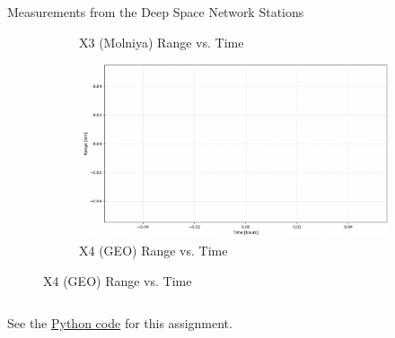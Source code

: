 \begin{hwkProblem}{4}{Measurements from the Deep Space Network Stations}
\begin{figure}[H]
\begin{center}
\begin{subfigure}{0.4\textwidth}
				\caption{X3 (Molniya) Range vs. Time}
			\end{subfigure}
			\begin{subfigure}{0.4\textwidth} \label{fig:s04b4}
				\includegraphics[width=\linewidth]{./images/s04b4.png}
				\caption{X4 (GEO) Range vs. Time}
			\end{subfigure}
		\end{center}
	\end{figure}

	\hwkPart{} \label{hwk:s04c}

	\inputminted{python}{./code/s04c.txt}

	\hwkCode{} \label{code:s04}

	See the \href{https://www.github.com/vaisriv/enae441-hw02/blob/main/code/hw02.py}{Python code} for this assignment.

\end{hwkProblem}


